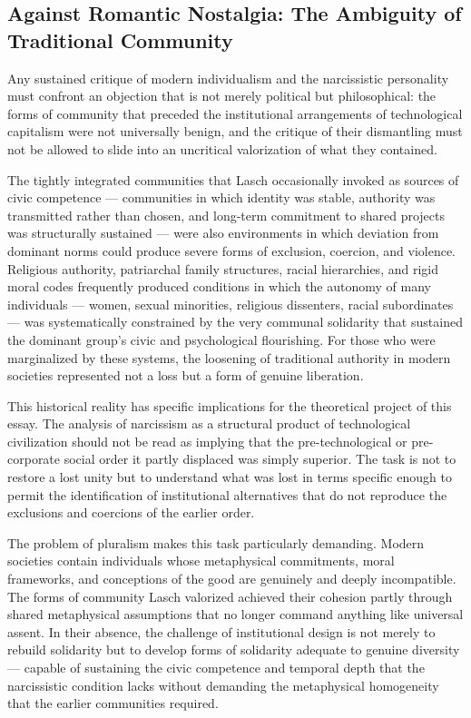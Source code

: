 \documentclass[12pt]{memoir}
\begin{document}
\subsection{Against Romantic Nostalgia: The Ambiguity of Traditional Community}

Any sustained critique of modern individualism and the narcissistic personality must
confront an objection that is not merely political but philosophical: the forms of
community that preceded the institutional arrangements of technological capitalism were
not universally benign, and the critique of their dismantling must not be allowed to
slide into an uncritical valorization of what they contained.

The tightly integrated communities that Lasch occasionally invoked as sources of civic
competence — communities in which identity was stable, authority was transmitted rather
than chosen, and long-term commitment to shared projects was structurally sustained
— were also environments in which deviation from dominant norms could produce severe
forms of exclusion, coercion, and violence. Religious authority, patriarchal family
structures, racial hierarchies, and rigid moral codes frequently produced conditions
in which the autonomy of many individuals — women, sexual minorities, religious
dissenters, racial subordinates — was systematically constrained by the very communal
solidarity that sustained the dominant group's civic and psychological flourishing.
For those who were marginalized by these systems, the loosening of traditional
authority in modern societies represented not a loss but a form of genuine liberation.

This historical reality has specific implications for the theoretical project of
this essay. The analysis of narcissism as a structural product of technological
civilization should not be read as implying that the pre-technological or
pre-corporate social order it partly displaced was simply superior. The task is not
to restore a lost unity but to understand what was lost in terms specific enough to
permit the identification of institutional alternatives that do not reproduce the
exclusions and coercions of the earlier order.

The problem of pluralism makes this task particularly demanding. Modern societies
contain individuals whose metaphysical commitments, moral frameworks, and conceptions
of the good are genuinely and deeply incompatible. The forms of community Lasch
valorized achieved their cohesion partly through shared metaphysical assumptions that
no longer command anything like universal assent. In their absence, the challenge of
institutional design is not merely to rebuild solidarity but to develop forms of
solidarity adequate to genuine diversity — capable of sustaining the civic competence
and temporal depth that the narcissistic condition lacks without demanding the
metaphysical homogeneity that the earlier communities required.
\end{document}
